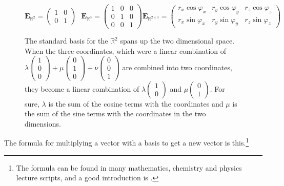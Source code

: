 \documentclass[a4paper]{article}
\begin{document}
\begin{Example}
\begin{figure}
\begin{displaymath}
    \boldsymbol{E}_{\mathbb{R}^2} = \begin{pmatrix}1 & 0 \\ 0 & 1\end{pmatrix}    \mbox{          }
    \boldsymbol{E}_{\mathbb{R}^3} = \begin{pmatrix}1 & 0 & 0\\ 0 & 1 & 0 \\ 0 & 0 & 1\end{pmatrix}    
    \boldsymbol{E}_{\mathbb{R}^{2\times3}} = \begin{pmatrix}r_x\cos\varphi_x&r_y\cos\varphi_y&r_z\cos\varphi_z\\r_x\sin\varphi_x&r_y\sin\varphi_y&r_z\sin\varphi_z\end{pmatrix} 
\end{displaymath}
\caption{The standard basis for the $\mathbb{R}^{2}$ spans up the two dimensional space. When the three coordinates, which were a linear combination of $\lambda\begin{pmatrix}1\\0\\0\end{pmatrix} + \mu\begin{pmatrix}0\\1\\0\end{pmatrix} + \nu\begin{pmatrix}0\\0\\1\end{pmatrix}$ are combined into two coordinates, they become a linear combination of $\lambda\begin{pmatrix}1\\0\end{pmatrix}$ and $\mu\begin{pmatrix}0\\1\end{pmatrix}$. For sure, $\lambda$ is the sum of the cosine terms with the coordinates and $\mu$ is the sum of the sine terms with the coordinates in the two dimensions. }
\end{figure}

The formula for multiplying a vector with a basis to get a new vector is this.\footnote{The formula can be found in many mathematics, chemistry and physics lecture scripts, and a good introduction is \cite{Strang1}.}\\


\end{Example}
\end{document}
